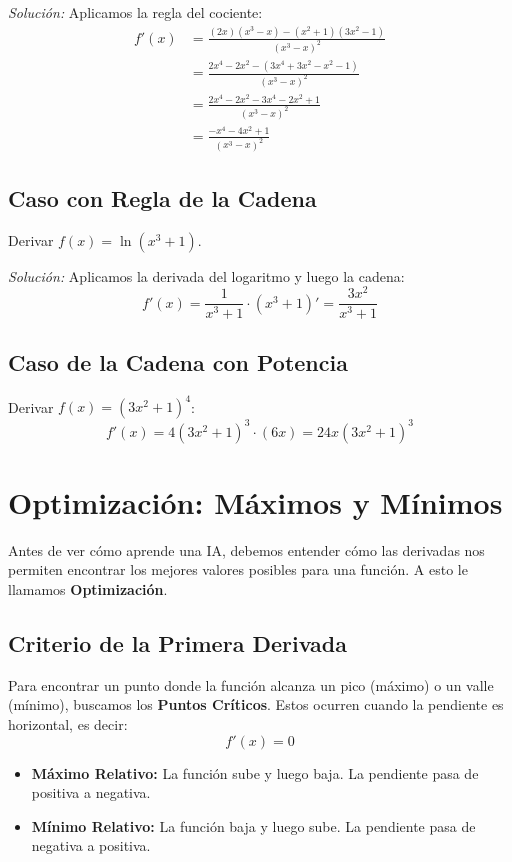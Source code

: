 \documentclass[12pt,a4paper,openany,oneside]{book}
\begin{document}
\textit{Solución:} Aplicamos la regla del cociente:
\begin{align*}
f'(x) &= \frac{(2x)(x^3 - x) - (x^2 + 1)(3x^2 - 1)}{(x^3 - x)^2} \\
&= \frac{2x^4 - 2x^2 - (3x^4 + 3x^2 - x^2 - 1)}{(x^3 - x)^2} \\
&= \frac{2x^4 - 2x^2 - 3x^4 - 2x^2 + 1}{(x^3 - x)^2} \\
&= \frac{-x^4 - 4x^2 + 1}{(x^3 - x)^2}
\end{align*}

\subsection{Caso con Regla de la Cadena}
Derivar $f(x) = \ln(x^3 + 1)$. 

\textit{Solución:} Aplicamos la derivada del logaritmo y luego la cadena:
\[
f'(x) = \frac{1}{x^3 + 1} \cdot (x^3 + 1)' = \frac{3x^2}{x^3 + 1}
\]

\subsection{Caso de la Cadena con Potencia}
Derivar $f(x) = (3x^2 + 1)^4$:
\[
f'(x) = 4(3x^2 + 1)^3 \cdot (6x) = 24x(3x^2 + 1)^3
\]

\section{Optimización: Máximos y Mínimos}

Antes de ver cómo aprende una IA, debemos entender cómo las derivadas nos permiten encontrar los mejores valores posibles para una función. A esto le llamamos \textbf{Optimización}.

\subsection{Criterio de la Primera Derivada}
Para encontrar un punto donde la función alcanza un pico (máximo) o un valle (mínimo), buscamos los \textbf{Puntos Críticos}. Estos ocurren cuando la pendiente es horizontal, es decir:
\[
f'(x) = 0
\]

\begin{itemize}
    \item \textbf{Máximo Relativo:} La función sube y luego baja. La pendiente pasa de positiva a negativa.
    \item \textbf{Mínimo Relativo:} La función baja y luego sube. La pendiente pasa de negativa a positiva.
\end{itemize}
\end{document}
